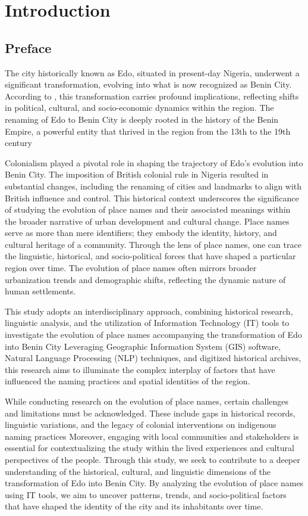\chapter{Introduction}
\section{Preface}


The city historically known as Edo, situated in present-day Nigeria, underwent a significant transformation, evolving into what is now recognized as Benin City. According to \cite{Michael2023}, this transformation carries profound implications, reflecting shifts in political, cultural, and socio-economic dynamics within the region. The renaming of Edo to Benin City is deeply rooted in the history of the Benin Empire, a powerful entity that thrived in the region from the 13th to the 19th century\cite{egharevba1968short} 

Colonialism played a pivotal role in shaping the trajectory of Edo's evolution into Benin City. The imposition of British colonial rule in Nigeria resulted in substantial changes, including the renaming of cities and landmarks to align with British influence and control\cite{falola2008history}. This historical context underscores the significance of studying the evolution of place names and their associated meanings within the broader narrative of urban development and cultural change.
Place names serve as more than mere identifiers; they embody the identity, history, and cultural heritage of a community\cite{Gelling}. Through the lens of place names, one can trace the linguistic, historical, and socio-political forces that have shaped a particular region over time. The evolution of place names often mirrors broader urbanization trends and demographic shifts, reflecting the dynamic nature of human settlements.

This study adopts an interdisciplinary approach, combining historical research, linguistic analysis, and the utilization of Information Technology (IT) tools to investigate the evolution of place names accompanying the transformation of Edo into Benin City Leveraging Geographic Information System (GIS) software, Natural Language Processing (NLP) techniques, and digitized historical archives, this research aims to illuminate the complex interplay of factors that have influenced the naming practices and spatial identities of the region.


While conducting research on the evolution of place names, certain challenges and limitations must be acknowledged. These include gaps in historical records, linguistic variations, and the legacy of colonial interventions on indigenous naming practices Moreover, engaging with local communities and stakeholders is essential for contextualizing the study within the lived experiences and cultural perspectives of the people.
Through this study, we seek to contribute to a deeper understanding of the historical, cultural, and linguistic dimensions of the transformation of Edo into Benin City. By analyzing the evolution of place names using IT tools, we aim to uncover patterns, trends, and socio-political factors that have shaped the identity of the city and its inhabitants over time.

